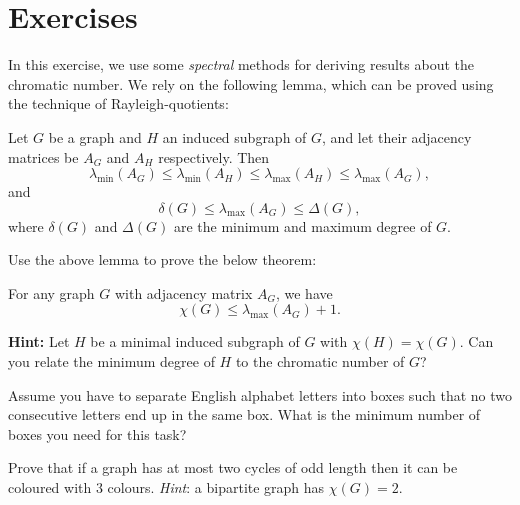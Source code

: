 \documentclass[nobib]{tufte-handout}
\begin{document}
\section{Exercises}

\begin{xca}
  In this exercise, we use some \emph{spectral} methods for deriving results about the chromatic number. We rely on the following lemma, which can be proved using the technique of Rayleigh-quotients:

  \begin{lemma}
    Let $G$ be a graph and $H$ an induced subgraph of $G$, and let their adjacency matrices be $A_G$ and $A_H$ respectively. Then
    $$\lambda_{\min}\left(A_G\right) \leq \lambda_{\min}\left(A_H\right) \leq \lambda_{\max}\left(A_H\right) \leq \lambda_{\max}\left(A_G\right),$$
    and
    $$\delta(G) \leq \lambda_{\max}\left(A_G\right) \leq \Delta(G),$$
    where $\delta(G)$ and $\Delta(G)$ are the minimum and maximum degree of $G$.
  \end{lemma}

  Use the above lemma to prove the below theorem:
  \begin{theorem}[Wilf, 1967]
    For any graph $G$ with adjacency matrix $A_G$, we have
    $$\chi(G) \leq \lambda_{\max}\left(A_G\right) + 1.$$
  \end{theorem}

  \textbf{Hint:} Let $H$ be a minimal induced subgraph of $G$ with $\chi(H) = \chi(G)$. Can you relate the minimum degree of $H$ to the chromatic number of $G$?
\end{xca}

\begin{xca}
Assume you have to separate English alphabet letters into boxes such that no two consecutive letters end up in the same box. What is the minimum number of boxes you need for this task?
\end{xca}

\begin{xca}
Prove that if a graph has at most two cycles of odd length then it can be
coloured with 3 colours. \textit{Hint}: a bipartite graph has $\chi(G) = 2$.
\end{xca}


%
%
\end{document}

